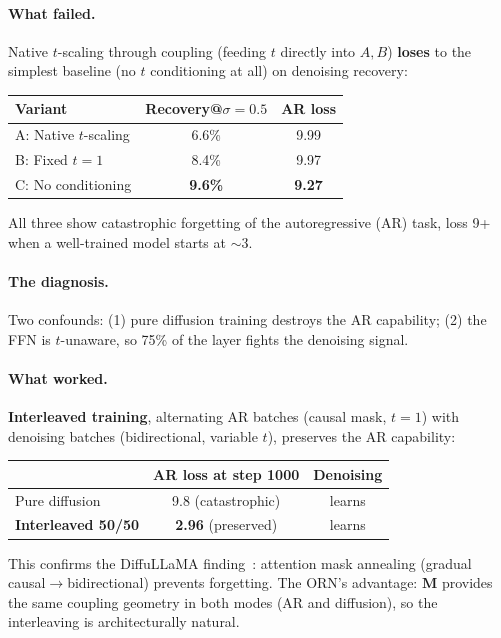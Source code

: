 \documentclass[11pt, a4paper]{article}
\newcommand{\M}{\mathbf{M}}
\theoremstyle{remark}
\begin{document}
\paragraph{What failed.}
Native $t$-scaling through coupling (feeding $t$ directly into $A, B$) \textbf{loses} to the simplest baseline (no $t$ conditioning at all) on denoising recovery:

\begin{center}\small
\begin{tabular}{@{}lcc@{}}
\toprule
\textbf{Variant} & \textbf{Recovery@$\sigma{=}0.5$} & \textbf{AR loss} \\
\midrule
A: Native $t$-scaling & 6.6\% & 9.99 \\
B: Fixed $t{=}1$ & 8.4\% & 9.97 \\
C: No conditioning & \textbf{9.6\%} & \textbf{9.27} \\
\bottomrule
\end{tabular}
\end{center}

All three show catastrophic forgetting of the autoregressive (AR) task, loss 9+ when a well-trained model starts at ${\sim}3$.

\paragraph{The diagnosis.}
Two confounds: (1) pure diffusion training destroys the AR capability; (2) the FFN is $t$-unaware, so 75\% of the layer fights the denoising signal.

\paragraph{What worked.}
\textbf{Interleaved training}, alternating AR batches (causal mask, $t{=}1$) with denoising batches (bidirectional, variable $t$), preserves the AR capability:

\begin{center}\small
\begin{tabular}{@{}lcc@{}}
\toprule
& \textbf{AR loss at step 1000} & \textbf{Denoising} \\
\midrule
Pure diffusion & 9.8 (catastrophic) & learns \\
\textbf{Interleaved 50/50} & \textbf{2.96} (preserved) & learns \\
\bottomrule
\end{tabular}
\end{center}

This confirms the DiffuLLaMA finding~\cite{liu2024llava}: attention mask annealing (gradual causal$\to$bidirectional) prevents forgetting.
The ORN's advantage: $\M$ provides the same coupling geometry in both modes (AR and diffusion), so the interleaving is architecturally natural.
\end{document}
